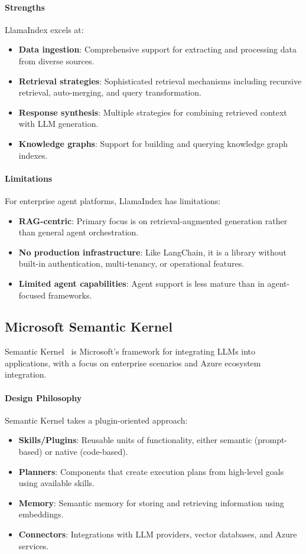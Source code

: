 \documentclass[a4paper,twoside]{sapthesis}
\begin{document}
\paragraph{Strengths}
LlamaIndex excels at:
\begin{itemize}
    \item \textbf{Data ingestion}: Comprehensive support for extracting and processing data from diverse sources.
    \item \textbf{Retrieval strategies}: Sophisticated retrieval mechanisms including recursive retrieval, auto-merging, and query transformation.
    \item \textbf{Response synthesis}: Multiple strategies for combining retrieved context with LLM generation.
    \item \textbf{Knowledge graphs}: Support for building and querying knowledge graph indexes.
\end{itemize}

\paragraph{Limitations}
For enterprise agent platforms, LlamaIndex has limitations:
\begin{itemize}
    \item \textbf{RAG-centric}: Primary focus is on retrieval-augmented generation rather than general agent orchestration.
    \item \textbf{No production infrastructure}: Like LangChain, it is a library without built-in authentication, multi-tenancy, or operational features.
    \item \textbf{Limited agent capabilities}: Agent support is less mature than in agent-focused frameworks.
\end{itemize}

\subsection{Microsoft Semantic Kernel}

Semantic Kernel~\cite{semantickernel2023}
is Microsoft's framework for integrating LLMs into applications, with a focus on enterprise scenarios and Azure ecosystem integration.

\paragraph{Design Philosophy}
Semantic Kernel takes a plugin-oriented approach:
\begin{itemize}
    \item \textbf{Skills/Plugins}: Reusable units of functionality, either semantic (prompt-based) or native (code-based).
    \item \textbf{Planners}: Components that create execution plans from high-level goals using available skills.
    \item \textbf{Memory}: Semantic memory for storing and retrieving information using embeddings.
    \item \textbf{Connectors}: Integrations with LLM providers, vector databases, and Azure services.
\end{itemize}
\end{document}
